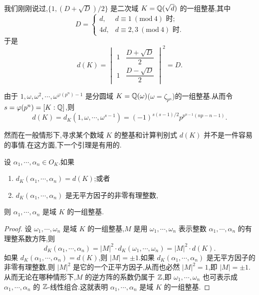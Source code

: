 \begin{example}\label{ex:ch1-2-3}
我们刚刚说过,$\{1,(D+\sqrt{D})/2\}$ 是二次域 $K=\mathbb{Q}(\sqrt{d})$ 的一组整基,其中
\[
  D=\begin{cases}
    d, & d\equiv 1\ (\mathrm{mod}\ 4)\text{ 时};\\
    4d, & d\equiv 2,3\ (\mathrm{mod}\ 4)\text{ 时}.
  \end{cases}
\]
于是
\[
  d(K)=\begin{vmatrix}
    1 & \dfrac{D+\sqrt{D}}{2}\\[2pt]
    1 & \dfrac{D-\sqrt{D}}{2}
  \end{vmatrix}^2=D.
\]
\end{example}

\begin{example}\label{ex:ch1-2-4}
由于 $1,\omega,\omega^2,\cdots,\omega^{\varphi(p^n)-1}$ 是分圆域 $K=\mathbb{Q}(\omega)$($\omega=\zeta_{p^n}$)的一组整基.从而令 $s=\varphi(p^n)=[K:\mathbb{Q}]$,则
\[
  d(K)=d_K(1,\omega,\cdots,\omega^{s-1})=(-1)^{s(s-1)/2}p^{p^{n-1}(np-n-1)}.
\]
\end{example}

然而在一般情形下,寻求某个数域 $K$ 的整基和计算判别式 $d(K)$ 并不是一件容易的事情.在这方面,下一个引理是有用的.

\begin{lemma}\label{lem:ch1-8}
设 $\alpha_1,\cdots,\alpha_n\in O_K$.如果
\begin{enumerate}[(1)]
  \item $d_K(\alpha_1,\cdots,\alpha_n)=d(K)$;或者
  \item $d_K(\alpha_1,\cdots,\alpha_n)$ 是无平方因子的非零有理整数,
\end{enumerate}
则 $\alpha_1,\cdots,\alpha_n$ 是域 $K$ 的一组整基.
\end{lemma}

\begin{proof}
设 $\omega_1,\cdots,\omega_n$ 是域 $K$ 的一组整基,$M$ 是用 $\omega_1,\cdots,\omega_n$ 表示整数 $\alpha_1,\cdots,\alpha_n$ 的有理整系数方阵,则
\[
  d_K(\alpha_1,\cdots,\alpha_n)=|M|^2\cdot d_K(\omega_1,\cdots,\omega_n)=|M|^2\cdot d(K).
\]
如果 $d_K(\alpha_1,\cdots,\alpha_n)=d(K)$,则 $|M|=\pm1$.如果 $d_K(\alpha_1,\cdots,\alpha_n)$ 是无平方因子的非零有理整数,则 $|M|^2$ 是它的一个正平方因子,从而也必然 $|M|^2=1$,即 $|M|=\pm1$.从而无论在哪种情形下,$M$ 的逆方阵的系数仍属于 $\mathbb{Z}$,即 $\omega_1,\cdots,\omega_n$ 也可表示成 $\alpha_1,\cdots,\alpha_n$ 的 $\mathbb{Z}$-线性组合.这就表明 $\alpha_1,\cdots,\alpha_n$ 是域 $K$ 的一组整基.
\end{proof}

